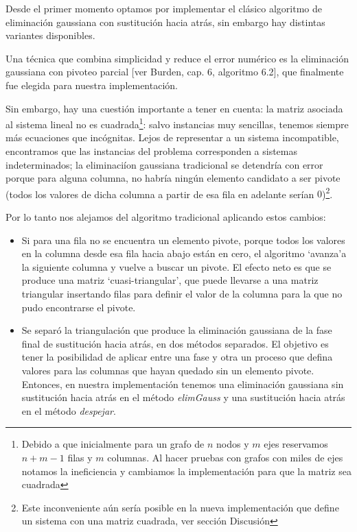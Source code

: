 Desde el primer momento optamos por implementar el cl\'asico algoritmo de eliminaci\'on gaussiana con sustituci\'on hacia atr\'as, sin embargo hay distintas variantes disponibles.

Una t\'ecnica que combina simplicidad y reduce el error num\'erico es la eliminaci\'on gaussiana con pivoteo parcial [ver Burden, cap. 6, algoritmo 6.2], que finalmente fue elegida para nuestra implementaci\'on.

Sin embargo, hay una cuesti\'on importante a tener en cuenta: la matriz asociada al sistema lineal no es cuadrada\footnote{Debido a que inicialmente para un grafo de $n$ nodos y $m$ ejes reservamos $n+m-1$ filas y $m$ columnas. Al hacer pruebas con grafos con miles de ejes notamos la ineficiencia y cambiamos la implementaci\'on para que la matriz sea cuadrada}: salvo instancias muy sencillas, tenemos siempre m\'as ecuaciones que inc\'ognitas.
Lejos de representar a un sistema incompatible, encontramos que las instancias del problema corresponden a sistemas indeterminados; la eliminaci\'ion gaussiana tradicional se detendr\'ia con error porque para alguna columna, no habr\'ia ning\'un elemento candidato a ser pivote (todos los valores de dicha columna a partir de esa fila en adelante ser\'ian $0$)\footnote{Este inconveniente a\'un ser\'ia posible en la nueva implementaci\'on que define un sistema con una matriz cuadrada, ver secci\'on Discusi\'on}.

Por lo tanto nos alejamos del algoritmo tradicional aplicando estos cambios:

\begin{itemize}
\item Si para una fila no se encuentra un elemento pivote, porque todos los valores en la columna desde esa fila hacia abajo est\'an en cero, el algoritmo `avanza'\thinspace a la siguiente columna y vuelve a buscar un pivote. El efecto neto es que se produce una matriz `cuasi-triangular', que puede llevarse a una matriz triangular insertando filas para definir el valor de la columna para la que no pudo encontrarse el pivote.

\item Se separ\'o la triangulaci\'on que produce la eliminaci\'on gaussiana de la fase final de sustituci\'on hacia atr\'as, en dos m\'etodos separados. El objetivo es tener la posibilidad de aplicar entre una fase y otra un proceso que defina valores para las columnas que hayan quedado sin un elemento pivote. Entonces, en nuestra implementaci\'on tenemos una eliminaci\'on gaussiana sin sustituci\'on hacia atr\'as en el m\'etodo \emph{elimGauss} y una sustituci\'on hacia atr\'as en el m\'etodo \emph{despejar}.

\end{itemize}

